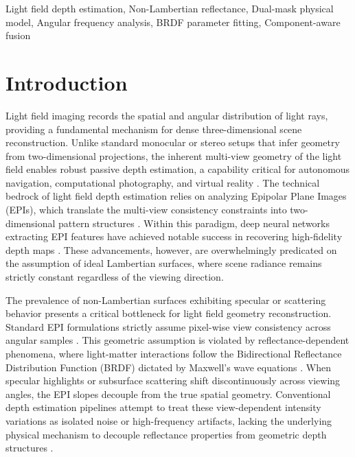 \documentclass[lettersize,journal]{IEEEtran}
\begin{document}
\begin{IEEEkeywords}
Light field depth estimation, Non-Lambertian reflectance, Dual-mask physical model, Angular frequency analysis, BRDF parameter fitting, Component-aware fusion
\end{IEEEkeywords}

\section{Introduction}

Light field imaging records the spatial and angular distribution of light rays, providing a fundamental mechanism for dense three-dimensional scene reconstruction. Unlike standard monocular or stereo setups that infer geometry from two-dimensional projections, the inherent multi-view geometry of the light field enables robust passive depth estimation, a capability critical for autonomous navigation, computational photography, and virtual reality \cite{ng2005, ng2006}. The technical bedrock of light field depth estimation relies on analyzing Epipolar Plane Images (EPIs), which translate the multi-view consistency constraints into two-dimensional pattern structures \cite{wanner2014, tao2013}. Within this paradigm, deep neural networks extracting EPI features have achieved notable success in recovering high-fidelity depth maps \cite{heber2018}. These advancements, however, are overwhelmingly predicated on the assumption of ideal Lambertian surfaces, where scene radiance remains strictly constant regardless of the viewing direction.

The prevalence of non-Lambertian surfaces exhibiting specular or scattering behavior presents a critical bottleneck for light field geometry reconstruction. Standard EPI formulations strictly assume pixel-wise view consistency across angular samples \cite{wang2015, chen2017}. This geometric assumption is violated by reflectance-dependent phenomena, where light-matter interactions follow the Bidirectional Reflectance Distribution Function (BRDF) dictated by Maxwell's wave equations \cite{blinn1977}. When specular highlights or subsurface scattering shift discontinuously across viewing angles, the EPI slopes decouple from the true spatial geometry. Conventional depth estimation pipelines attempt to treat these view-dependent intensity variations as isolated noise or high-frequency artifacts, lacking the underlying physical mechanism to decouple reflectance properties from geometric depth structures \cite{li2021, zhang2023}.
\end{document}
